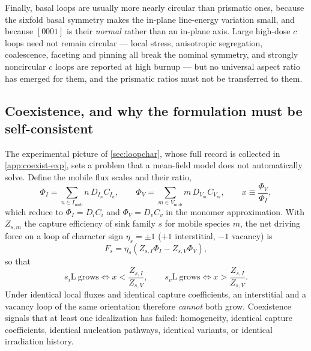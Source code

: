\documentclass{article}
\begin{document}
Finally, basal loops are usually more nearly circular than prismatic ones,
because the sixfold basal symmetry makes the in-plane line-energy variation
small, and because $[0001]$ is their \emph{normal} rather than an in-plane axis.
Large high-dose $c$ loops need not remain circular --- local stress, anisotropic
segregation, coalescence, faceting and pinning all break the nominal symmetry,
and strongly noncircular $c$ loops are reported at high burnup --- but no
universal aspect ratio has emerged for them, and the prismatic ratios must not
be transferred to them.

\subsection{Coexistence, and why the formulation must be self-consistent}
\label{sec:coexist}

The experimental picture of \cref{sec:loopchar}, whose full record is collected in
\cref{app:coexist-exp}, sets a problem that a mean-field
model does not automatically solve. Define the mobile flux scales and their
ratio,
\begin{equation}
  \Phi_I=\sum_{n\in I_{\mathrm{mob}}}n\,D_{I_n}C_{I_n},
  \qquad
  \Phi_V=\sum_{m\in V_{\mathrm{mob}}}m\,D_{V_m}C_{V_m},
  \qquad
  x\equiv\frac{\Phi_V}{\Phi_I},
  \label{eq:fluxscales}
\end{equation}
which reduce to $\Phi_I=D_iC_i$ and $\Phi_V=D_vC_v$ in the monomer
approximation. With $Z_{s,m}$ the capture efficiency of sink family $s$ for
mobile species $m$, the net driving force on a loop of character sign
$\eta_s=\pm1$ ($+1$ interstitial, $-1$ vacancy) is
\begin{equation}
  F_s=\eta_s\left(Z_{s,I}\Phi_I-Z_{s,V}\Phi_V\right),
  \label{eq:Fsigma}
\end{equation}
so that
\begin{equation}
  s_i\mathrm{L}\ \text{grows}\iff x<\frac{Z_{s,I}}{Z_{s,V}},
  \qquad
  s_v\mathrm{L}\ \text{grows}\iff x>\frac{Z_{s,I}}{Z_{s,V}}.
  \label{eq:growconds}
\end{equation}
Under identical local fluxes and identical capture coefficients, an interstitial
and a vacancy loop of the same orientation therefore \emph{cannot} both grow.
Coexistence signals that at least one idealization has failed: homogeneity,
identical capture coefficients, identical nucleation pathways, identical
variants, or identical irradiation history.
\end{document}
